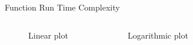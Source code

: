 \begin{frame}{Function Run Time Complexity}{}
    \begin{columns}[c]
        \begin{figure}[H]
            \caption{Linear plot}
        \end{figure}

        \begin{figure}[H]
            \caption{Logarithmic plot}
        \end{figure}
    \end{columns}
\end{frame}
